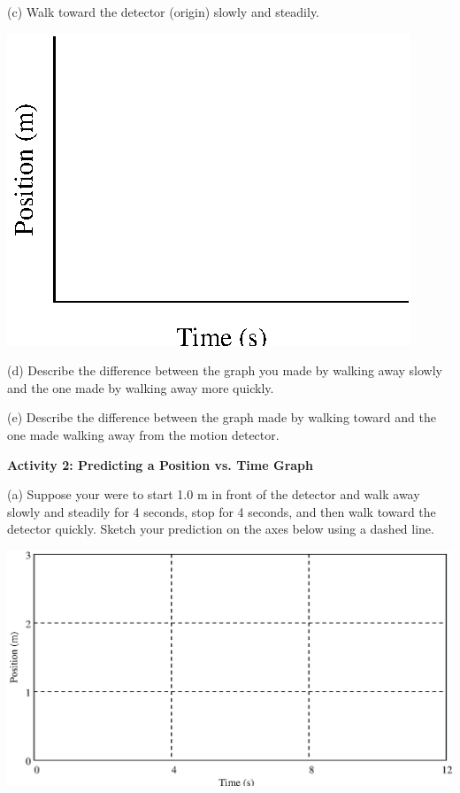 (c) Walk toward the detector (origin) slowly and steadily.

\vspace{0.3cm}
{\par\centering \includegraphics{position/position_fig1.eps} \par}
\vspace{0.3cm}

(d) Describe the difference between the graph you made by walking away slowly
and the one made by walking away more quickly.
\vspace{20mm}

(e) Describe the difference between the graph made by walking toward and the
one made walking away from the motion detector.
\vspace{20mm}

\textbf{Activity 2: Predicting a Position vs. Time Graph} 

(a) Suppose your were to start 1.0 m in front of the detector and walk away
slowly and steadily for 4 seconds, stop for 4 seconds, and then walk toward
the detector quickly. Sketch your prediction on the axes below using a dashed
line.

\vspace{0.3cm}
{\par\centering \includegraphics{position/position_fig2.eps} \par}
\vspace{0.3cm}

